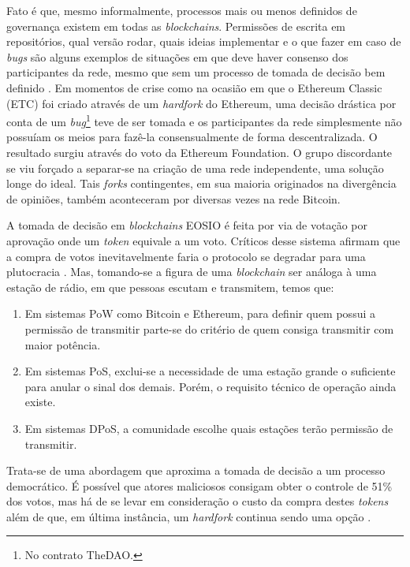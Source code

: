 \documentclass[a4paper,12pt]{monografia}
\theoremstyle{plain}
\theoremstyle{definition}
\theoremstyle{remark}
\begin{document}
Fato \'e que, mesmo informalmente, processos mais ou menos definidos de governan\c{c}a existem em todas as \textit{blockchains}.
Permiss\~oes de escrita em reposit\'orios, qual vers\~ao rodar, quais ideias implementar e o que fazer em caso de \textit{bugs} s\~ao alguns exemplos de situa\c{c}\~oes em que deve haver consenso dos participantes da rede, mesmo que sem um processo de tomada de decis\~ao bem definido \cite{decentgovern}.
Em momentos de crise como na ocasi\~{a}o em que o Ethereum Classic (ETC) foi criado atrav\'{e}s de um \textit{hardfork} do Ethereum, uma decis\~{a}o dr\'{a}stica por conta de um \textit{bug}\footnote{No contrato TheDAO.} teve de ser tomada e os participantes da rede simplesmente n\~{a}o possu\'{i}am os meios para faz\^{e}-la consensualmente de forma descentralizada.
O resultado surgiu atrav\'{e}s do voto da Ethereum Foundation.
O grupo discordante se viu for\c{c}ado a separar-se na cria\c{c}\~{a}o de uma rede independente, uma solu\c{c}\~{a}o longe do ideal.
Tais \textit{forks} contingentes, em sua maioria originados na diverg\^encia de opini\~oes, tamb\'em aconteceram por diversas vezes na rede Bitcoin.

A tomada de decis\~ao em \textit{blockchains} EOSIO \'e feita por via de vota\c{c}\~ao por aprova\c{c}\~ao \cite{approvalvoting} onde um \textit{token} equivale a um voto.
Cr\'iticos desse sistema afirmam que a compra de votos inevitavelmente faria o protocolo se degradar para uma plutocracia \cite{plutocracy}.
Mas, tomando-se a figura de uma \textit{blockchain} ser an\'aloga \`a uma esta\c{c}\~ao de r\'adio, em que pessoas escutam e transmitem, temos que:

\begin{enumerate}
\item Em sistemas PoW como Bitcoin e Ethereum, para definir quem possui a permiss\~ao de transmitir parte-se do crit\'erio de quem consiga transmitir com maior pot\^encia.
\item Em sistemas PoS, exclui-se a necessidade de uma esta\c{c}\~ao grande o suficiente para anular o sinal dos demais. Por\'em, o requisito t\'ecnico de opera\c{c}\~ao ainda existe.
\item Em sistemas DPoS, a comunidade escolhe quais esta\c{c}\~oes ter\~ao permiss\~ao de transmitir. 
\end{enumerate}

Trata-se de uma abordagem que aproxima a tomada de decis\~ao a um processo democr\'atico.
\'E poss\'ivel que atores maliciosos consigam obter o controle de 51\% dos votos, mas h\'a de se levar em considera\c{c}\~ao o custo da compra destes \textit{tokens} al\'em de que, em \'ultima inst\^ancia, um \textit{hardfork} continua sendo uma op\c{c}\~ao \cite{radio}.
\end{document}
